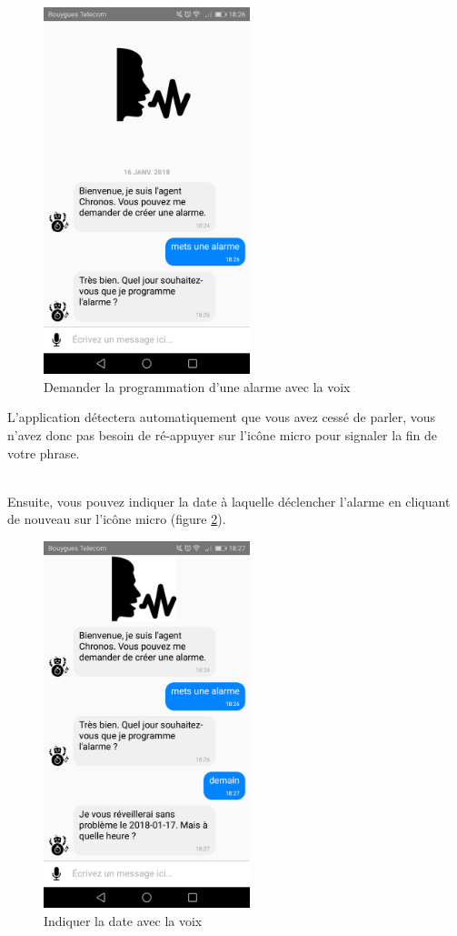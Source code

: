 \begin{figure}[H]
  \centering
  \includegraphics[width=6cm]{images/C.png}
  \caption{Demander la programmation d'une alarme avec la voix}
  \label{C}
\end{figure}

L'application détectera automatiquement que vous avez cessé de parler, vous n'avez donc pas besoin de ré-appuyer sur l'icône micro pour signaler la fin de votre phrase.

~\\\indent Ensuite, vous pouvez indiquer la date à laquelle déclencher l'alarme en cliquant de nouveau sur l'icône micro (figure \ref{D}).

\begin{figure}[H]
  \centering
  \includegraphics[width=6cm]{images/D.png}
  \caption{Indiquer la date avec la voix}
  \label{D}
\end{figure}

